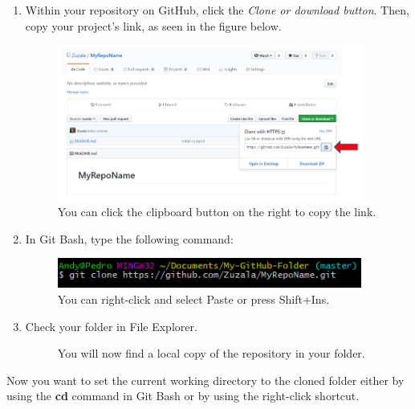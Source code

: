 \documentclass[12pt]{article}
\begin{document}
    \begin{enumerate}
        \item Within your repository on GitHub, click the \emph{Clone or download button}. Then, copy your project's link, as seen in the figure below.
        \newpage
        \begin{figure}[h!]
            \includegraphics[width=10cm, center]{GitHub-Clone}
            \caption{You can click the clipboard button on the right to copy the link.}
        \end{figure}
        \item In Git Bash, type the following command:
         \begin{figure}[h!]
            \includegraphics[width=10cm, center]{Git-Clone}
            \caption{You can right-click and select Paste or press Shift+Ins.}
        \end{figure}
        \item Check your folder in File Explorer. \\
        \begin{figure}[h!]
            \centering
            \qquad
            \caption{You will now find a local copy of the repository in your folder.}
        \end{figure}
    \end{enumerate}
Now you want to set the current working directory to the cloned folder either by using the \textbf{cd} command in Git Bash or by using the right-click shortcut.
\newpage
\end{document}
